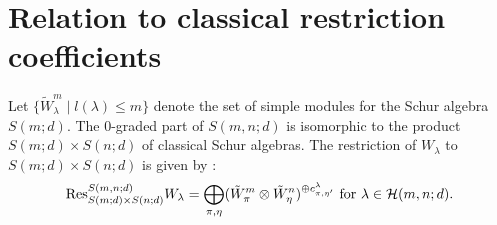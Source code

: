 \documentclass[12pt,reqno]{amsart}
\theoremstyle{definition}
\theoremstyle{remark}
\begin{document}
\section{Relation to classical restriction coefficients}
Let $\{\tilde{W}^{m}_{\lambda}\mid l(\lambda)\leq m \}$ denote the set of simple modules for the Schur algebra $S(m;d)$.
The $0$-graded part of $S(m,n;d)$ is isomorphic to the product $S(m;d)\times S(n;d)$ of classical Schur algebras. 
The restriction of $W_{\lambda}$ to $S(m;d)\times S(n;d)$ is given by \cite[Theorem~6.11]{berele1987hook}:
\begin{align}\label{eq1}
    \text{Res}^{S(m,n;d)}_{S(m;d)\times S(n;d)}W_{\lambda}=\bigoplus_{\pi,\eta}(\tilde{W}^{m}_{\pi}\otimes \tilde{W}^{n}_{\eta})^{\oplus c^{\lambda}_{\pi,\eta'}}\hbox{ for }\lambda\in\mathcal{H}(m,n;d).
\end{align}
\end{document}
